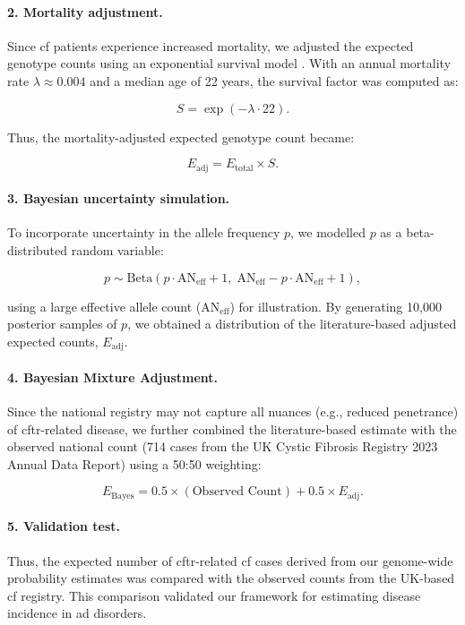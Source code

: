 \paragraph{2. Mortality adjustment.}
Since \ac{cf} patients experience increased mortality, we adjusted the expected genotype counts using an exponential survival model \cite{naito2023uk, castellani2013cftr2, Grasemann2023cftr}. With an annual mortality rate \(\lambda \approx 0.004\) and a median age of 22 years, the survival factor was computed as:

\[
S = \exp(-\lambda \cdot 22).
\]

Thus, the mortality-adjusted expected genotype count became:

\[
E_{\text{adj}} = E_{\text{total}} \times S.
\]

\paragraph{3. Bayesian uncertainty simulation.}
To incorporate uncertainty in the allele frequency \( p \), we modelled \( p \) as a beta-distributed random variable:

\[
p \sim \mathrm{Beta}(p \cdot \text{AN}_{\text{eff}} + 1,\; \text{AN}_{\text{eff}} - p \cdot \text{AN}_{\text{eff}} + 1),
\]

using a large effective allele count (\(\text{AN}_{\text{eff}}\)) for illustration. 
By generating 10,000 posterior samples of \( p \), we obtained a distribution of the literature-based adjusted expected counts, \(E_{\text{adj}}\).

\paragraph{4. Bayesian Mixture Adjustment.}
Since the national registry may not capture all nuances (e.g., reduced penetrance) of \ac{cftr}-related disease, we further combined the literature-based estimate with the observed national count (714 cases from the UK Cystic Fibrosis Registry 2023 Annual Data Report) using a 50:50 weighting:

\[
E_{\text{Bayes}} = 0.5 \times (\text{Observed Count}) + 0.5 \times E_{\text{adj}}.
\]

\paragraph{5. Validation test.}
Thus, the expected number of \ac{cftr}-related \ac{cf} cases derived from our genome-wide probability estimates was compared with the observed counts from the UK-based \ac{cf} registry. This comparison validated our framework for estimating disease incidence in \ac{ad} disorders.

